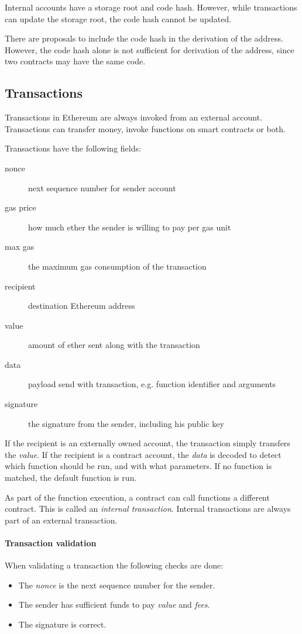 \begin{note}
Internal accounts have a storage root and code hash. However, while transactions can update the storage root, the code hash cannot be updated.	

There are proposals to include the code hash in the derivation of the address.
However, the code hash alone is not sufficient for derivation of the address, since two contracts may have the same code.
\end{note}

\subsection{Transactions}
Transactions in Ethereum are always invoked from an external account. 
Transactions can transfer money, invoke functions on smart contracts or both.

Transactions have the following fields:
\begin{description}
	\item[nonce] next sequence number for sender account
	\item[gas price] how much ether the sender is willing to pay per gas unit
	\item[max gas] the maximum gas consumption of the transaction
	\item[recipient] destination Ethereum address
	\item[value] amount of ether sent along with the transaction
	\item[data] payload send with transaction, e.g. function identifier and arguments
	\item[signature] the signature from the sender, including his public key
\end{description}

If the recipient is an externally owned account, the transaction simply transfers the \emph{value}.
If the recipient is a contract account, the \emph{data} is decoded to detect which function should be run, and with what parameters. If no function is matched, the default function is run.

As part of the function execution, a contract can call functions a different contract. This is called an \emph{internal transaction}. Internal transactions are always part of an external transaction.

\paragraph{Transaction validation}
When validating a transaction the following checks are done:
\begin{itemize}
	\item The \emph{nonce} is the next sequence number for the sender.
	\item The sender has sufficient funds to pay \emph{value} and \emph{fees}.
	\item The signature is correct.
\end{itemize}

